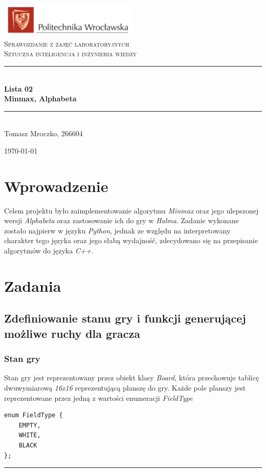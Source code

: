 \documentclass[a4paper, 12pt]{article}
\newcommand{\HRule}{\rule{\linewidth}{0.5mm}}
\begin{document}
\begin{titlepage}
  \begin{center}
    \includegraphics[width=0.5\textwidth]{images/logo.png}~\\[1cm]

    \textsc{Sprawozdanie z zajęć laboratoryjnych\\ Sztuczna inteligencja i inżynieria wiedzy\\[3cm]}


    \HRule \\[0.4cm]
    {\large \bfseries Lista 02 \\ Minmax, Alphabeta \\[0.4cm]}
    \HRule \\[8cm]


    Tomasz Mroczko, 266604 \\[3cm]

    \vfill

    {\today}

  \end{center}
\end{titlepage}


\newpage
\tableofcontents
\newpage


\section{Wprowadzenie}
Celem projektu było zaimplementowanie algorytmu 
\textit{Minmax} oraz jego ulepszonej wersji \textit{Alphabeta} oraz zastosowanie 
ich do gry w \textit{Halma}. Zadanie wykonane zostało najpierw w języku \textit{Python},
jednak ze względu na interpretowany charakter tego języka oraz jego słabą wydajność, 
zdecydowano się na przepisanie algorytmów do języka \textit{C++}.



\section{Zadania}

\subsection{Zdefiniowanie stanu gry i funkcji generującej możliwe ruchy dla gracza}
\subsubsection{Stan gry}
Stan gry jest reprezentowany przez obiekt klasy \textit{Board},
która przechowuje tablicę dwuwymiarową \textit{16x16} reprezentującą planszę do gry.
Każde pole planszy jest reprezentowane przez jedną z wartości 
enumeracji \textit{FieldType}
\begin{lstlisting}
enum FieldType {
	EMPTY,
	WHITE,
	BLACK
};
\end{lstlisting}
\vspace{0.5cm}
\hrule
\vspace{1cm}
\end{document}
